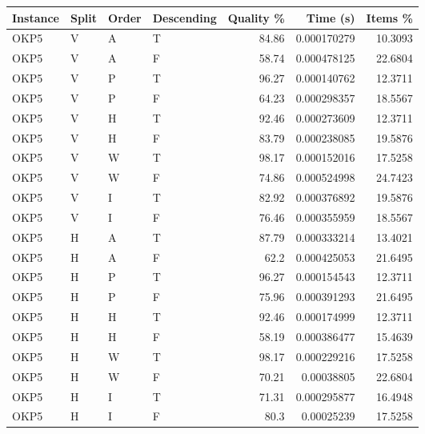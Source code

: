 \begin{tabular}{llllrrr}
    \hline
    Instance & Split & Order & Descending & Quality \% & Time (s)    & Items \% \\
    \hline
    OKP5     & V     & A     & T          & 84.86      & 0.000170279 & 10.3093  \\
    OKP5     & V     & A     & F          & 58.74      & 0.000478125 & 22.6804  \\
    OKP5     & V     & P     & T          & 96.27      & 0.000140762 & 12.3711  \\
    OKP5     & V     & P     & F          & 64.23      & 0.000298357 & 18.5567  \\
    OKP5     & V     & H     & T          & 92.46      & 0.000273609 & 12.3711  \\
    OKP5     & V     & H     & F          & 83.79      & 0.000238085 & 19.5876  \\
    OKP5     & V     & W     & T          & 98.17      & 0.000152016 & 17.5258  \\
    OKP5     & V     & W     & F          & 74.86      & 0.000524998 & 24.7423  \\
    OKP5     & V     & I     & T          & 82.92      & 0.000376892 & 19.5876  \\
    OKP5     & V     & I     & F          & 76.46      & 0.000355959 & 18.5567  \\
    OKP5     & H     & A     & T          & 87.79      & 0.000333214 & 13.4021  \\
    OKP5     & H     & A     & F          & 62.2       & 0.000425053 & 21.6495  \\
    OKP5     & H     & P     & T          & 96.27      & 0.000154543 & 12.3711  \\
    OKP5     & H     & P     & F          & 75.96      & 0.000391293 & 21.6495  \\
    OKP5     & H     & H     & T          & 92.46      & 0.000174999 & 12.3711  \\
    OKP5     & H     & H     & F          & 58.19      & 0.000386477 & 15.4639  \\
    OKP5     & H     & W     & T          & 98.17      & 0.000229216 & 17.5258  \\
    OKP5     & H     & W     & F          & 70.21      & 0.00038805  & 22.6804  \\
    OKP5     & H     & I     & T          & 71.31      & 0.000295877 & 16.4948  \\
    OKP5     & H     & I     & F          & 80.3       & 0.00025239  & 17.5258  \\

\end{tabular}
